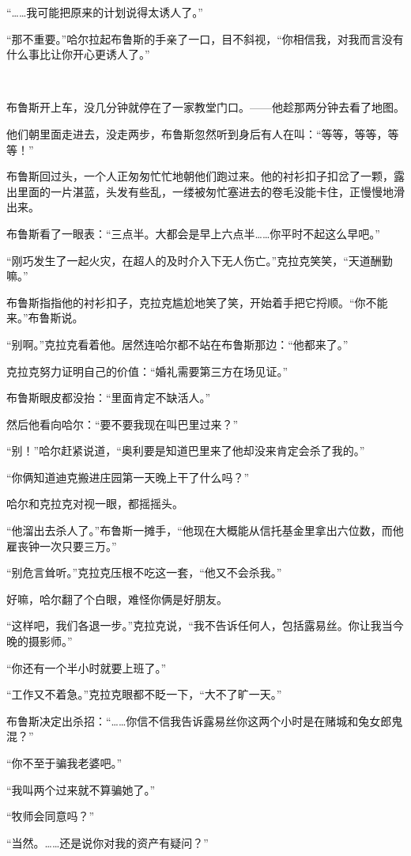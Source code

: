 \documentclass[../main]{subfiles}
\begin{document}
“……我可能把原来的计划说得太诱人了。”

“那不重要。”哈尔拉起布鲁斯的手亲了一口，目不斜视，“你相信我，对我而言没有什么事比让你开心更诱人了。”

~\

布鲁斯开上车，没几分钟就停在了一家教堂门口。——他趁那两分钟去看了地图。

他们朝里面走进去，没走两步，布鲁斯忽然听到身后有人在叫：“等等，等等，等等！”

布鲁斯回过头，一个人正匆匆忙忙地朝他们跑过来。他的衬衫扣子扣岔了一颗，露出里面的一片湛蓝，头发有些乱，一缕被匆忙塞进去的卷毛没能卡住，正慢慢地滑出来。

布鲁斯看了一眼表：“三点半。大都会是早上六点半……你平时不起这么早吧。”

“刚巧发生了一起火灾，在超人的及时介入下无人伤亡。”克拉克笑笑，“天道酬勤嘛。”

布鲁斯指指他的衬衫扣子，克拉克尴尬地笑了笑，开始着手把它捋顺。“你不能来。”布鲁斯说。

“别啊。”克拉克看着他。居然连哈尔都不站在布鲁斯那边：“他都来了。”

克拉克努力证明自己的价值：“婚礼需要第三方在场见证。”

布鲁斯眼皮都没抬：“里面肯定不缺活人。”

然后他看向哈尔：“要不要我现在叫巴里过来？”

“别！”哈尔赶紧说道，“奥利要是知道巴里来了他却没来肯定会杀了我的。”

“你俩知道迪克搬进庄园第一天晚上干了什么吗？”

哈尔和克拉克对视一眼，都摇摇头。

“他溜出去杀人了。”布鲁斯一摊手，“他现在大概能从信托基金里拿出六位数，而他雇丧钟一次只要三万。”

“别危言耸听。”克拉克压根不吃这一套，“他又不会杀我。”

好嘛，哈尔翻了个白眼，难怪你俩是好朋友。

“这样吧，我们各退一步。”克拉克说，“我不告诉任何人，包括露易丝。你让我当今晚的摄影师。”

“你还有一个半小时就要上班了。”

“工作又不着急。”克拉克眼都不眨一下，“大不了旷一天。”

布鲁斯决定出杀招：“……你信不信我告诉露易丝你这两个小时是在赌城和兔女郎鬼混？”

“你不至于骗我老婆吧。”

“我叫两个过来就不算骗她了。”

“牧师会同意吗？”

“当然。……还是说你对我的资产有疑问？”
\end{document}
